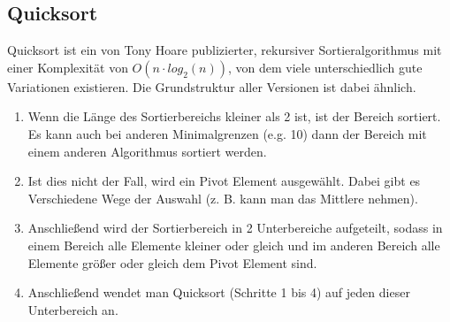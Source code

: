 \begin{figure}[H]
    \centering
\end{figure}

\clearpage

\subsection{Quicksort}

Quicksort ist ein von Tony Hoare publizierter, rekursiver Sortieralgorithmus mit einer
Komplexität von $O(n \cdot log_{2}(n))$, von dem viele unterschiedlich gute Variationen existieren.
Die Grundstruktur aller Versionen ist dabei ähnlich.

\begin{enumerate}
    \item Wenn die Länge des Sortierbereichs kleiner als 2 ist, ist der Bereich sortiert.
    Es kann auch bei anderen Minimalgrenzen (e.g. 10) dann der Bereich mit einem anderen
    Algorithmus sortiert werden.
    \item Ist dies nicht der Fall, wird ein Pivot Element ausgewählt. Dabei gibt es Verschiedene
    Wege der Auswahl (z. B. kann man das Mittlere nehmen).
    \item Anschließend wird der Sortierbereich in 2 Unterbereiche aufgeteilt, sodass in einem
    Bereich alle Elemente kleiner oder gleich und im anderen Bereich alle Elemente größer oder gleich
    dem Pivot Element sind.
    \item Anschließend wendet man Quicksort (Schritte 1 bis 4) auf jeden dieser Unterbereich an.
\end{enumerate}

